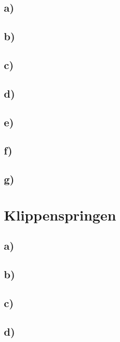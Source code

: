 \documentclass[a4paper,12pt]{scrartcl}
\begin{document}
\subsection*{a)}
\subsection*{b)}
\subsection*{c)}
\subsection*{d)}
\subsection*{e)}
\subsection*{f)}
\subsection*{g)}

\section{Klippenspringen}

\subsection*{a)}
\subsection*{b)}
\subsection*{c)}
\subsection*{d)}
\end{document}
